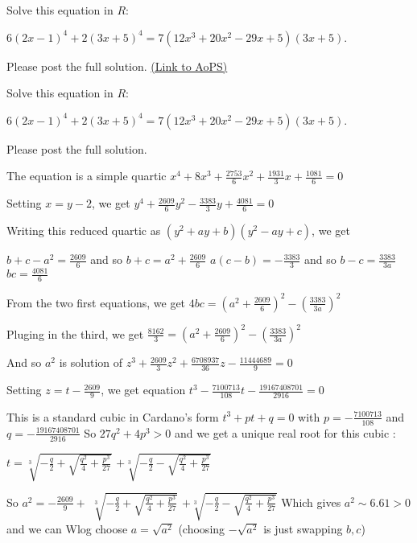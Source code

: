 \begin{problem}
	Solve this equation in $R$: 

$6{\left( {2x - 1} \right)^4} + 2{\left( {3x + 5} \right)^4} = 7\left( {12{x^3} + 20{x^2} - 29x + 5} \right)(3x + 5)$.

Please post the full solution.
	\flushright \href{https://artofproblemsolving.com/community/c6h529641}{(Link to AoPS)}
\end{problem}



\begin{solution}
	\begin{tcolorbox}Solve this equation in $R$: 

$6{\left( {2x - 1} \right)^4} + 2{\left( {3x + 5} \right)^4} = 7\left( {12{x^3} + 20{x^2} - 29x + 5} \right)(3x + 5)$.

Please post the full solution.\end{tcolorbox}
The equation is a simple quartic $x^4+8x^3+\frac{2753}6x^2+\frac{1931}3x+\frac{1081}6=0$

Setting $x=y-2$, we get $y^4+\frac{2609}6y^2-\frac{3383}3y+\frac{4081}6=0$

Writing this reduced quartic as $(y^2+ay+b)(y^2-ay+c)$, we get 

$b+c-a^2=\frac{2609}6$ and so $b+c=a^2+\frac{2609}6$
$a(c-b)=-\frac{3383}3$ and so $b-c=\frac{3383}{3a}$ 
$bc=\frac{4081}6$

From the two first equations, we get $4bc=\left(a^2+\frac{2609}6\right)^2-\left(\frac{3383}{3a}\right)^2$

Pluging in the third, we get $\frac{8162}3=\left(a^2+\frac{2609}6\right)^2-\left(\frac{3383}{3a}\right)^2$

And so $a^2$ is solution of $z^3+\frac{2609}3z^2+\frac{6708937}{36}z-\frac{11444689}9=0$

Setting $z=t-\frac{2609}9$, we get equation $t^3-\frac{7100713}{108}t-\frac{19167408701}{2916}=0$

This is a standard cubic in Cardano's form $t^3+pt+q=0$ with $p=-\frac{7100713}{108}$ and $q=-\frac{19167408701}{2916}$
So $27q^2+4p^3>0$ and we get a unique real root for this cubic :

$t=\sqrt[3]{-\frac q2+\sqrt{\frac{q^2}4+\frac{p^3}{27}}}$ $+\sqrt[3]{-\frac q2-\sqrt{\frac{q^2}4+\frac{p^3}{27}}}$

So $a^2=-\frac{2609}9+$ $\sqrt[3]{-\frac q2+\sqrt{\frac{q^2}4+\frac{p^3}{27}}}$ $+\sqrt[3]{-\frac q2-\sqrt{\frac{q^2}4+\frac{p^3}{27}}}$
Which gives $a^2\sim 6.61>0$ and we can Wlog choose $a=\sqrt{a^2}$ (choosing $-\sqrt{a^2}$ is just swapping $b,c$)


\end{solution}
